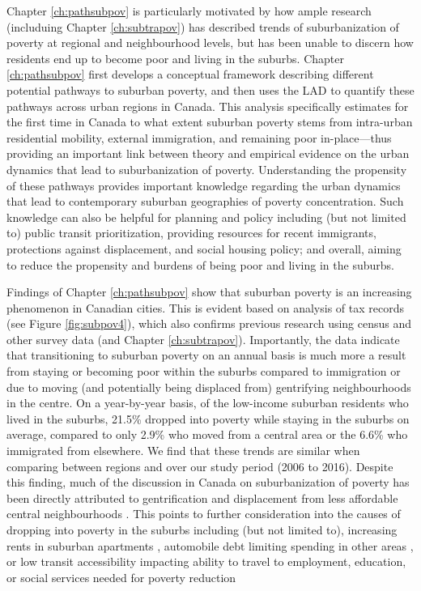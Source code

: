 Chapter \ref{ch:pathsubpov} is particularly motivated by how ample research (includuing Chapter \ref{ch:subtrapov}) has described trends of suburbanization of poverty at regional and neighbourhood levels, but has been unable to discern how residents end up to become poor and living in the suburbs. Chapter \ref{ch:pathsubpov} first develops a conceptual framework describing different potential pathways to suburban poverty, and then uses the LAD to quantify these pathways across urban regions in Canada. This analysis specifically estimates for the first time in Canada to what extent suburban poverty stems from intra-urban residential mobility, external immigration, and remaining poor in-place---thus providing an important link between theory and empirical evidence on the urban dynamics that lead to suburbanization of poverty. Understanding the propensity of these pathways provides important knowledge regarding the urban dynamics that lead to contemporary suburban geographies of poverty concentration. Such knowledge can also be helpful for planning and policy including (but not limited to) public transit prioritization, providing resources for recent immigrants, protections against displacement, and social housing policy; and overall, aiming to reduce the propensity and burdens of being poor and living in the suburbs.

Findings of Chapter \ref{ch:pathsubpov} show that suburban poverty is an increasing phenomenon in Canadian cities. This is evident based on analysis of tax records (see Figure \ref{fig:subpov4}), which also confirms previous research using census and other survey data \cite{ades_are_2012,breau_pulling_2018,grant_changing_2020} (and Chapter \ref{ch:subtrapov}). Importantly, the data indicate that transitioning to suburban poverty on an annual basis is much more a result from staying or becoming poor within the suburbs compared to immigration or due to moving (and potentially being displaced from) gentrifying neighbourhoods in the centre. On a year-by-year basis, of the low-income suburban residents who lived in the suburbs, 21.5\% dropped into poverty while staying in the suburbs on average, compared to only 2.9\% who moved from a central area or the 6.6\% who immigrated from elsewhere. We find that these trends are similar when comparing between regions and over our study period (2006 to 2016). Despite this finding, much of the discussion in Canada on suburbanization of poverty has been directly attributed to gentrification and displacement from less affordable central neighbourhoods \cite{grant_changing_2020}. This points to further consideration into the causes of dropping into poverty in the suburbs including (but not limited to), increasing rents in suburban apartments \cite{august_gentrification_2018}, automobile debt limiting spending in other areas \cite{walks_driving_2018}, or low transit accessibility impacting ability to travel to employment, education, or social services needed for poverty reduction \cite{allen_planning_2020} 

